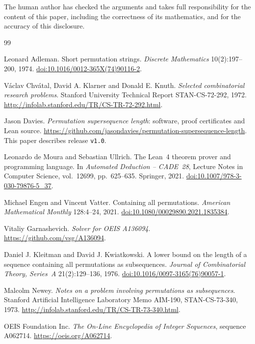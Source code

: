 \documentclass[11pt]{article}
\newcommand{\repo}{\url{https://github.com/jasondavies/permutation-supersequence-length}}
\begin{document}
The human author has checked the arguments and takes full responsibility for the content of this paper, including the correctness of its mathematics, and for the accuracy of this disclosure.

\begin{thebibliography}{99}
\raggedright
{}
Leonard Adleman.
Short permutation strings.
\emph{Discrete Mathematics} 10(2):197--200, 1974.
\href{https://doi.org/10.1016/0012-365X(74)90116-2}{doi:10.1016/0012-365X(74)90116-2}.

V\'aclav Chv\'atal, David A. Klarner and Donald E. Knuth.
\emph{Selected combinatorial research problems}.
Stanford University Technical Report STAN-CS-72-292, 1972.
\url{http://infolab.stanford.edu/TR/CS-TR-72-292.html}.

Jason Davies.
\emph{Permutation supersequence length}: software, proof certificates and Lean source.
\repo. This paper describes release \texttt{v1.0}.

Leonardo de Moura and Sebastian Ullrich.
The Lean~4 theorem prover and programming language.
In \emph{Automated Deduction -- CADE~28}, Lecture Notes in Computer Science,
vol.~12699, pp.~625--635. Springer, 2021.
\href{https://doi.org/10.1007/978-3-030-79876-5_37}{doi:10.1007/978-3-030-79876-5\_37}.

Michael Engen and Vincent Vatter.
Containing all permutations.
\emph{American Mathematical Monthly} 128:4--24, 2021.
\href{https://doi.org/10.1080/00029890.2021.1835384}{doi:10.1080/00029890.2021.1835384}.

Vitaliy Garnashevich.
\emph{Solver for OEIS A136094}.
\url{https://github.com/vsg/A136094}.

Daniel J. Kleitman and David J. Kwiatkowski.
A lower bound on the length of a sequence containing all permutations as subsequences.
\emph{Journal of Combinatorial Theory, Series~A} 21(2):129--136, 1976.
\href{https://doi.org/10.1016/0097-3165(76)90057-1}{doi:10.1016/0097-3165(76)90057-1}.

Malcolm Newey.
\emph{Notes on a problem involving permutations as subsequences}.
Stanford Artificial Intelligence Laboratory Memo AIM-190, STAN-CS-73-340, 1973.
\url{http://infolab.stanford.edu/TR/CS-TR-73-340.html}.

OEIS Foundation Inc.
\emph{The On-Line Encyclopedia of Integer Sequences}, sequence A062714.
\url{https://oeis.org/A062714}.


\end{thebibliography}
\end{document}
